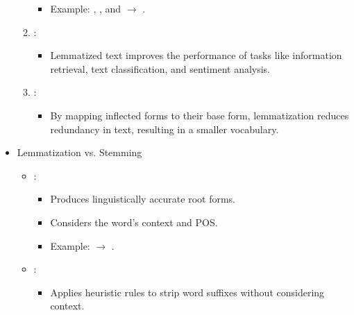 \documentclass[letterpaper,11pt,english]{sphinxmanual}
\begin{document}
\begin{itemize}
\begin{enumerate}
\begin{itemize}
\item {} 
\sphinxAtStartPar
Example:
\sphinxhyphen{} , , and  \(\rightarrow\) .

\end{itemize}

\item {} 
\sphinxAtStartPar
{}:
\begin{itemize}
\item {} 
\sphinxAtStartPar
Lemmatized text improves the performance of tasks like information retrieval, text classification, and sentiment analysis.

\end{itemize}

\item {} 
\sphinxAtStartPar
{}:
\begin{itemize}
\item {} 
\sphinxAtStartPar
By mapping inflected forms to their base form, lemmatization reduces redundancy in text, resulting in a smaller vocabulary.

\end{itemize}

\end{enumerate}

\item {} 
\sphinxAtStartPar
Lemmatization vs. Stemming
\begin{itemize}
\item {} 
\sphinxAtStartPar
{}:
\begin{itemize}
\item {} 
\sphinxAtStartPar
Produces linguistically accurate root forms.

\item {} 
\sphinxAtStartPar
Considers the word’s context and POS.

\item {} 
\sphinxAtStartPar
Example:
\sphinxhyphen{}  \(\rightarrow\) .

\end{itemize}

\item {} 
\sphinxAtStartPar
{}:
\begin{itemize}
\item {} 
\sphinxAtStartPar
Applies heuristic rules to strip word suffixes without considering context.


\end{itemize}
\end{itemize}
\end{itemize}
\end{document}
